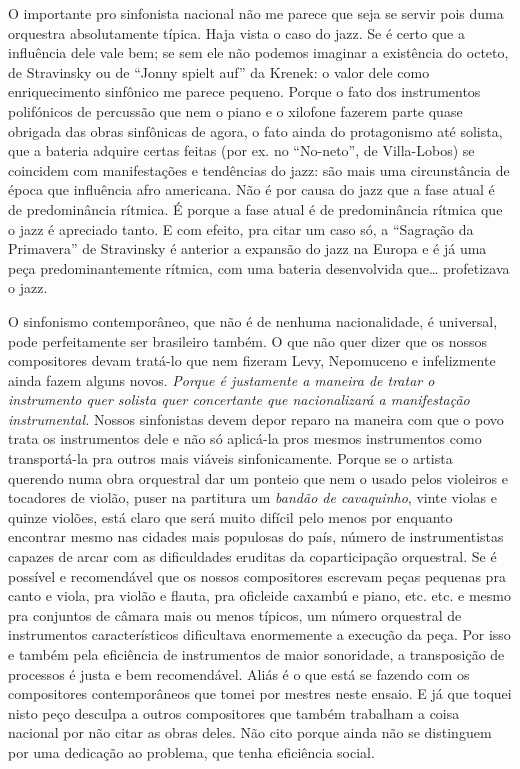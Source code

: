 O importante pro sinfonista nacional não me parece que seja se servir
pois duma orquestra absolutamente típica. Haja vista o caso do jazz. Se
é certo que a influência dele vale bem; se sem ele não podemos imaginar
a existência do octeto, de Stravinsky ou de ``Jonny spielt auf'' da
Krenek: o valor dele como enriquecimento sinfônico me parece pequeno.
Porque o fato dos instrumentos polifónicos de percussão que nem o piano
e o xilofone fazerem parte quase obrigada das obras sinfônicas de agora,
o fato ainda do protagonismo até solista, que a bateria adquire certas
feitas (por ex. no ``No-neto'', de Villa-Lobos) se coincidem com
manifestações e tendências do jazz: são mais uma circunstância de época
que influência afro americana. Não é por causa do jazz que a fase atual
é de predominância rítmica. É porque a fase atual é de predominância
rítmica que o jazz é apreciado tanto. E com efeito, pra citar um caso
só, a ``Sagração da Primavera'' de Stravinsky é anterior a expansão do
jazz na Europa e é já uma peça predominantemente rítmica, com uma
bateria desenvolvida que\ldots{} profetizava o jazz.

O sinfonismo contemporâneo, que não é de nenhuma nacionalidade, é
universal, pode perfeitamente ser brasileiro também. O que não quer
dizer que os nossos compositores devam tratá-lo que nem fizeram Levy,
Nepomuceno e infelizmente ainda fazem alguns novos. \emph{Porque é
justamente a maneira de tratar o instrumento quer solista quer
concertante que nacionalizará a manifestação instrumental.} Nossos
sinfonistas devem depor reparo na maneira com que o povo trata os
instrumentos dele e não só aplicá-la pros mesmos instrumentos como
transportá-la pra outros mais viáveis sinfonicamente. Porque se o
artista querendo numa obra orquestral dar um ponteio que nem o usado
pelos violeiros e tocadores de violão, puser na partitura um
\emph{bandão de cavaquinho}, vinte violas e quinze violões, está claro
que será muito difícil pelo menos por enquanto encontrar mesmo nas
cidades mais populosas do país, número de instrumentistas capazes de
arcar com as dificuldades eruditas da coparticipação orquestral. Se é
possível e recomendável que os nossos compositores escrevam peças
pequenas pra canto e viola, pra violão e flauta, pra oficleide caxambú e
piano, etc. etc. e mesmo pra conjuntos de câmara mais ou menos típicos,
um número orquestral de instrumentos característicos dificultava
enormemente a execução da peça. Por isso e também pela eficiência de
instrumentos de maior sonoridade, a transposição de processos é justa e
bem recomendável. Aliás é o que está se fazendo com os compositores
contemporâneos que tomei por mestres neste ensaio. E já que toquei nisto
peço desculpa a outros compositores que também trabalham a coisa
nacional por não citar as obras deles. Não cito porque ainda não se
distinguem por uma dedicação ao problema, que tenha eficiência social.

